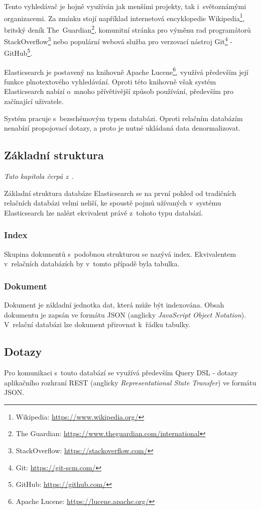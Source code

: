 Tento vyhledávač je hojně využíván jak menšími projekty, tak i~světoznámými organizacemi. Za zmínku stojí například internetová encyklopedie Wikipedia\footnote{Wikipedia: \url{https://www.wikipedia.org/}}, britský deník The~Guardian\footnote{The Guardian: \url{https://www.theguardian.com/international}}, komunitní stránka pro výměnu rad programátorů StackOverflow\footnote{StackOverflow: \url{https://stackoverflow.com/}} nebo populární webová služba pro verzovací nástroj Git\footnote{Git: \url{https://git-scm.com/}} - GitHub\footnote{GitHub: \url{https://github.com/}}.

Elasticsearch je postavený na knihovně Apache Lucene\footnote{Apache Lucene: \url{https://lucene.apache.org/}}, využívá především její funkce plnotextového vyhledávání. Oproti této knihovně však systém Elasticsearch nabízí o~mnoho přívětivější způsob používání, především pro začínající uživatele. 

Systém pracuje s~bezschémovým typem databázi. Oproti relačním databázím nenabízí propojovací dotazy, a proto je nutné ukládaná data denormalizovat.

\subsection{Základní struktura}
\emph{Tato kapitola čerpá z~\cite{bib:elastic-concept}}.

Základní struktura databáze Elasticsearch se na první pohled od tradičních relačních databázi velmi neliší, ke spoustě pojmů užívaných v~systému Elasticsearch lze nalézt ekvivalent právě z~tohoto typu databází.

\subsubsection*{Index}\label{section:index}
Skupina dokumentů s~podobnou strukturou se nazývá index. Ekvivalentem v~relačních databázích by v~tomto případě byla tabulka.

\subsubsection*{Dokument}\label{section:dokument}
Dokument je základní jednotka dat, která může být indexována. Obsah dokumentu je zapsán ve formátu JSON (anglicky \emph{JavaScript Object Notation}). V~relační databázi lze dokument přirovnat k~řádku tabulky.


\subsection{Dotazy}
Pro komunikaci s~touto databází se využívá především Query DSL - dotazy aplikačního rozhraní REST (anglicky \emph{Representational State Transfer}) ve formátu JSON.


